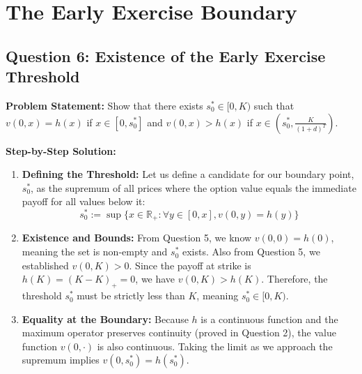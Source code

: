 \section{The Early Exercise Boundary}

\subsection*{Question 6: Existence of the Early Exercise Threshold}

\textbf{Problem Statement:}
Show that there exists $s_0^* \in [0,K)$ such that $v(0,x) = h(x)$ if $x \in [0,s_0^*]$ and $v(0,x) > h(x)$ if $x \in (s_0^*, \frac{K}{(1+d)^T})$.

\textbf{Step-by-Step Solution:}
\begin{enumerate}
    \item \textbf{Defining the Threshold:} Let us define a candidate for our boundary point, $s_0^*$, as the supremum of all prices where the option value equals the immediate payoff for all values below it:
    \begin{equation*}
        s_0^* := \sup\{x \in \mathbb{R}_+ : \forall y \in [0, x], v(0,y) = h(y)\}
    \end{equation*}

    \item \textbf{Existence and Bounds:} 
    From Question 5, we know $v(0,0) = h(0)$, meaning the set is non-empty and $s_0^*$ exists. 
    Also from Question 5, we established $v(0,K) > 0$. Since the payoff at strike is $h(K) = (K-K)_+ = 0$, we have $v(0,K) > h(K)$. Therefore, the threshold $s_0^*$ must be strictly less than $K$, meaning $s_0^* \in [0,K)$.

    \item \textbf{Equality at the Boundary:} Because $h$ is a continuous function and the maximum operator preserves continuity (proved in Question 2), the value function $v(0,\cdot)$ is also continuous. Taking the limit as we approach the supremum implies $v(0,s_0^*) = h(s_0^*)$.


\end{enumerate}
